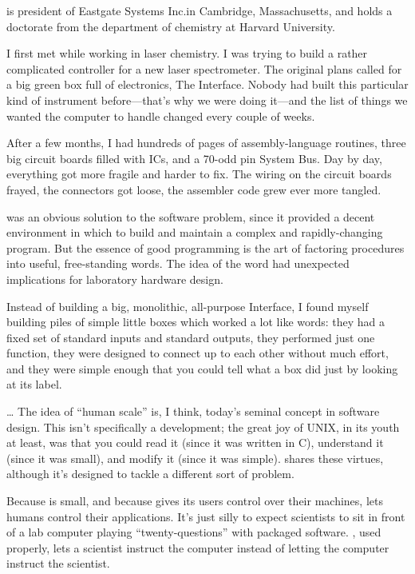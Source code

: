 \begin{interview}
 is president of Eastgate Systems Inc.\@ in Cambridge, 
Massachusetts, and holds a doctorate from the department of 
chemistry at Harvard University.

\begin{tfquot}
I first met \Forth{} while working in laser chemistry.  I was trying to
build a rather complicated controller for a new laser spectrometer.  The
original plans called for a big green box full of electronics, The
Interface.  Nobody had built this particular kind of instrument
before---that's why we were doing it---and the list of things we wanted
the computer to handle changed every couple of weeks.

After a few months, I had hundreds of pages of assembly-language routines,
three big circuit boards filled with ICs, and a 70-odd pin System Bus.
Day by day, everything got more fragile and harder to fix.  The wiring on
the circuit boards frayed, the connectors got loose, the assembler code
grew ever more tangled.

\Forth{} was an obvious solution to the software problem, since it
provided a decent environment in which to build and maintain a complex and
rapidly-changing program.  But the essence of good \Forth{} programming is
the art of factoring procedures into useful, free-standing words.  The
idea of the \Forth{} word had unexpected implications for laboratory
hardware design.

Instead of building a big, monolithic, all-purpose Interface, I found
myself building piles of simple little boxes which worked a lot like
\Forth{} words: they had a fixed set of standard inputs and standard
outputs, they performed just one function, they were designed to connect
up to each other without much effort, and they were simple enough that you
could tell what a box did just by looking at its label.

\dots{} The idea of ``human scale'' is, I think, today's seminal concept
in software design.  This isn't specifically a \Forth{} development; the
great joy of UNIX, in its youth at least, was that you could read it
(since it was written in C), understand it (since it was small), and
modify it (since it was simple).  \Forth{} shares these virtues, although
it's designed to tackle a different sort of problem.

Because \Forth{} is small, and because \Forth{} gives its users control
over their machines, \Forth{} lets humans control their applications.
It's just silly to expect scientists to sit in front of a lab computer
playing ``twenty-questions'' with packaged software.  \Forth{}, used
properly, lets a scientist instruct the computer instead of letting the
computer instruct the scientist.


\end{tfquot}
\end{interview}
